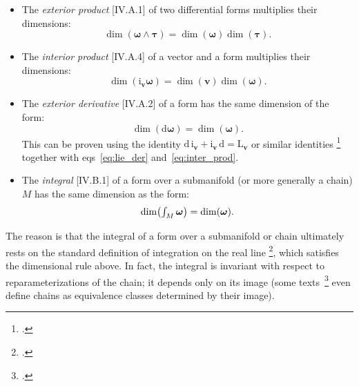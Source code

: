 \documentclass[a4paper,12pt,onecolumn,oneside,article,british]{memoir}
\newcommand*{\citep}{\footcites}
\newcommand*{\di}{\mathrm{d}}%
\newcommand*{\sect}{\S}%
\newcommand*{\sects}{\S\S}%
\newcommand*{\chap}{ch.}%
\newcommand*{\eqns}{eqs}%
\newcommand*{\eg}{{e.g.}}
\newcommand*{\tint}{\begingroup\textstyle\int\endgroup\nolimits}
\newcommand*{\Li}{\mathrm{L}}
\newcommand*{\ii}{\mathrm{i}}
\newcommand*{\yom}{\bm{\omega}}
\newcommand*{\yta}{\bm{\tau}}
\newcommand*{\yv}{\bm{v}}
\begin{document}
\begin{itemize}[wide=0pt]
\item The \emph{exterior product} [IV.A.1] of two differential forms
  multiplies their dimensions:
  \begin{equation}
  \dim(\yom\land\yta) = \dim(\yom)\dim(\yta).\label{eq:ext_prod}
\end{equation}
  
\item The \emph{interior product} [IV.A.4] of a vector and a form
  multiplies their dimensions:
  \begin{equation}
    \dim(\ii_{\yv}\yom) =\dim(\yv)\dim(\yom).
    \label{eq:inter_prod}
\end{equation}

\item The \emph{exterior derivative} [IV.A.2] of a form has the same
  dimension of the form:
  \begin{equation}
    \dim(\di\yom) =\dim(\yom).
    \label{eq:ext_deriv}
  \end{equation}
  This can be proven using the identity
  $\di\,\ii_{\yv}+\ii_{\yv}\,\di = \Li_{\yv}$ or similar identities
  \citep[\chap~9 p.~180 Theorem~9.78]{curtisetal1985}[\sect~6.4
  Theorem~6.4.8]{abrahametal1983_r1988} together with
  \eqns~\eqref{eq:lie_der} and~\eqref{eq:inter_prod}.

\item The \emph{integral} [IV.B.1] of a form over a submanifold (or more
  generally a chain) $M$ has the same dimension as the form:
  \begin{equation}
    \dim\bigl(\tint_{M}\yom\bigr) =\dim(\yom).
    \label{eq:integration}
  \end{equation}
\end{itemize}
The reason is that the integral of a form over a submanifold or chain
ultimately rests on the standard definition of integration on the real line
\citep[\eg][\sects~IV.B.1--2]{choquetbruhatetal1977_r1996}[\sect~5 p.~21,
\sect~6
p.~24]{derham1955_t1984}[\sect~7.1]{abrahametal1983_r1988}[\sect~VI.2]{boothby1975_r2003},
which satisfies the dimensional rule above. In fact, the integral is
invariant with respect to reparameterizations of the chain; it depends only
on its image (some texts~\citep[\eg][\sect~10.4
p.~297]{martin1991_r2004}[\sect~7.3]{fecko2006} even define chains as
equivalence classes determined by their image).

\medskip

\end{document}

